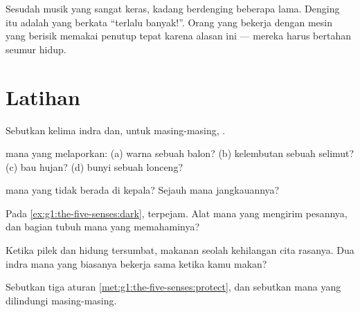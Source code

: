 \begin{example}\label{ex:g1:the-five-senses:loud}
Sesudah musik yang sangat keras,  kadang berdenging beberapa
lama. Denging itu adalah  yang berkata ``terlalu banyak!''.
Orang yang bekerja dengan mesin yang berisik memakai penutup 
tepat karena alasan ini ---  mereka harus bertahan seumur
hidup.
\end{example}

\section{Latihan}

\begin{exercise}[$\star$]\label{exo:g1:the-five-senses:1}
Sebutkan kelima indra dan, untuk masing-masing, .
\end{exercise}

\begin{exercise}[$\star$]\label{exo:g1:the-five-senses:2}
 mana yang melaporkan: (a) warna sebuah balon? (b) kelembutan
sebuah selimut? (c) bau hujan? (d) bunyi sebuah lonceng?
\end{exercise}

\begin{exercise}[$\star$]\label{exo:g1:the-five-senses:3}
 mana yang tidak berada di kepala? Sejauh mana jangkauannya?
\end{exercise}

\begin{exercise}[$\star$]\label{exo:g1:the-five-senses:4}
Pada \cref{ex:g1:the-five-senses:dark},  terpejam. Alat mana
yang mengirim pesannya, dan bagian tubuh mana yang memahaminya?
\end{exercise}

\begin{exercise}[$\star$]\label{exo:g1:the-five-senses:5}
Ketika pilek dan hidung tersumbat, makanan seolah kehilangan cita
rasanya. Dua indra mana yang biasanya bekerja sama ketika kamu makan?
\end{exercise}

\begin{exercise}[$\star$]\label{exo:g1:the-five-senses:6}
Sebutkan tiga aturan \cref{met:g1:the-five-senses:protect}, dan
sebutkan  mana yang dilindungi masing-masing.
\end{exercise}

